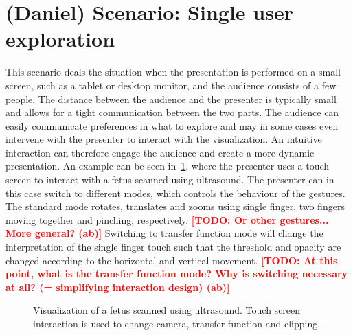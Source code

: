 \documentclass[review,journal]{vgtc}         %
\newcommand{\todo}[1]{\textbf{\textcolor{red}{[TODO: {#1}]}}}
\begin{document}
\section{(Daniel) Scenario: Single user exploration}

This scenario deals the situation when the presentation is performed on a small screen, such as a tablet or desktop monitor, and the audience consists of a few people. 
The distance between the audience and the presenter is typically small and allows for a tight communication between the two parts. 
The audience can easily communicate preferences in what to explore and may in some cases even intervene with the presenter to interact with the visualization. 
An intuitive interaction can therefore engage the audience and create a more dynamic presentation.
An example can be seen in~\cref{img:touch_workstation}, where the presenter uses a touch screen to interact with a fetus scanned using ultrasound.
The presenter can in this case switch to different modes, which controls the behaviour of the gestures. 
The standard mode rotates, translates and zooms using single finger, two fingers moving together and pinching, respectively. \todo{Or other gestures... More general? (ab)}
Switching to transfer function mode will change the interpretation of the single finger touch such that the threshold and opacity are changed according to the horizontal and vertical movement. \todo{At this point, what is the transfer function mode? Why is switching necessary at all? (= simplifying interaction design) (ab)}

%
%
%
%

\begin{figure}[htb]
	\centering
	\caption{Visualization of a fetus scanned using ultrasound. Touch screen interaction is used to change camera, transfer function and clipping.}
	\label{img:touch_workstation}
\end{figure}
\end{document}
